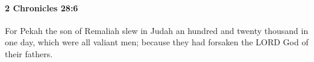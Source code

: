 
		\paragraph{2 Chronicles 28:6} %
			\label{2CHRONICLES-28-6}

			For Pekah the son of Remaliah slew in Judah an hundred and twenty thousand in one day, which were all valiant men; because they had forsaken the LORD God of their fathers.


